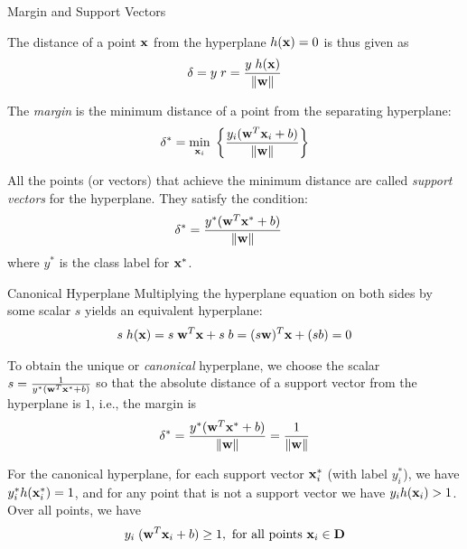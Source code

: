 \begin{frame}{Margin and Support Vectors}

The distance of a point $\mathbf{x}$ from the
hyperplane $h(\mathbf{x})=0$ is thus given as
\begin{align*}
  \delta = y\; r = {y\; h(\mathbf{x}) \over \| \mathbf{w} \|}
\end{align*}

The {\em margin} is the minimum distance of a point from the 
separating
hyperplane:
\begin{align*}
  \delta^* = \min_{\mathbf{x}_i} \; \left\{ {y_i(\mathbf{w}^T\mathbf{x}_i + b) \over \|
  \mathbf{w} \|} \right\}
\end{align*}

All the points (or vectors) that achieve the minimum
distance are called {\em support vectors}
for the hyperplane. They satisfy the condition:
\begin{align*}
\delta^* & = {y^*(\mathbf{w}^T\mathbf{x}^* + b) \over \| \mathbf{w} \|}
\end{align*}
where $y^*$ is the class label for $\mathbf{x}^*$.
\end{frame}


\begin{frame}{Canonical Hyperplane}
Multiplying the hyperplane equation on both sides by some scalar $s$ yields an equivalent
hyperplane:
\begin{align*}
    s \; h(\mathbf{x}) = s\; \mathbf{w}^T\mathbf{x} + s\; b = (s\mathbf{w})^T\mathbf{x} + (sb) = 0
\end{align*}

\medskip
To obtain the unique or {\em canonical} hyperplane,
we choose the scalar $s={1 \over y^*(\mathbf{w}^T\mathbf{x}^* + b)}$ so
that the absolute distance of a support vector from the
hyperplane is $1$, i.e., the margin is  
\begin{align*}
  \delta^* = {y^* (\mathbf{w}^T\mathbf{x}^* + b) \over \left\lVert\mathbf{w}\right\rVert} = {1 \over \| \mathbf{w} \|}
\end{align*}

\medskip
For the canonical hyperplane, for each support vector $\mathbf{x}^*_i$
(with label $y_i^*$), we have $y^*_i h(\mathbf{x}^*_i) = 1$, and for any
point that is not a support vector we have \hbox{$y_i h(\mathbf{x}_i) > 1$}.
Over all points, we have
\begin{align*}
  y_i \; (\mathbf{w}^T\mathbf{x}_i + b) \ge 1, \mbox{ for all points } \mathbf{x}_i \in \mathbf{D}
\end{align*}
\end{frame}







